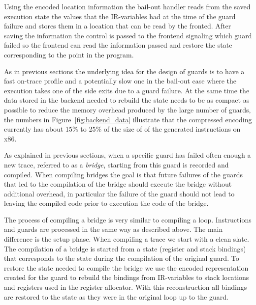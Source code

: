 \documentclass[10pt,preprint]{sigplanconf}
\begin{document}
Using the encoded location information the bail-out handler reads from the
saved execution state the values that the IR-variables had  at the time of the
guard failure and stores them in a location that can be read by the fronted.
After saving the information the control is passed to the frontend signaling
which guard failed so the frontend can read the information passed and restore
the state corresponding to the point in the program.

As in previous sections the underlying idea for the design of guards is to have
a fast on-trace profile and a potentially slow one in the bail-out case where
the execution takes one of the side exits due to a guard failure. At the same
time the data stored in the backend needed to rebuild the state needs to be as
compact as possible to reduce the memory overhead produced by the large number
of guards, the numbers in Figure~\ref{fig:backend_data} illustrate that the
compressed encoding currently has about 15\% to 25\% of the size of of the
generated instructions on x86.

As explained in previous sections, when a specific guard has failed often enough
a new trace, referred to as a \emph{bridge}, starting from this guard is recorded and
compiled. When compiling bridges the goal is that future failures of the guards
that led to the compilation of the bridge should execute the bridge without
additional overhead, in particular the failure of the guard should not lead
to leaving the compiled code prior to execution the code of the bridge.

The process of compiling a bridge is very similar to compiling a loop.
Instructions and guards are processed in the same way as described above. The
main difference is the setup phase. When compiling a trace we start with a clean
slate. The compilation of a bridge is started from a state (register and stack
bindings) that corresponds to the state during the compilation of the original
guard. To restore the state needed to compile the bridge we use the encoded
representation created for the guard to rebuild the bindings from IR-variables
to stack locations and registers used in the register allocator.  With this
reconstruction all bindings are restored to the state as they were in the
original loop up to the guard.
\end{document}
